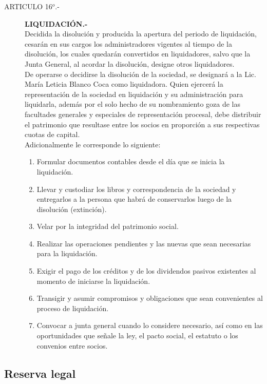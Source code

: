 \documentclass[11pt,letterpaper]{report}
\begin{document}
\begin{description}
\item[ARTICULO 16$^{o}$.-]{\bf LIQUIDACI\'ON.- }\\
Decidida la disoluci\'on y producida la apertura del periodo de liquidaci\'on, cesar\'an en sus cargos los administradores vigentes al tiempo de la disoluci\'on, los cuales quedar\'an convertidos en liquidadores, salvo que la Junta General, al acordar la disoluci\'on, designe otros liquidadores.\\
De operarse o decidirse la disoluci\'on de la sociedad, se designar\'a a la Lic. Mar\'ia Leticia Blanco Coca como liquidadora. Quien ejercer\'a la representaci\'on de la sociedad en liquidaci\'on y su administraci\'on para liquidarla, adem\'as por el solo hecho de su nombramiento goza de las facultades generales y especiales de representaci\'on procesal, debe distribuir el patrimonio que resultase entre los socios en proporci\'on a sus respectivas cuotas de capital.\\
Adicionalmente le corresponde lo siguiente:
\begin{enumerate}
\item Formular documentos contables desde el d\'ia que se inicia la liquidaci\'on.
\item Llevar y custodiar los libros y correspondencia de la sociedad y entregarlos a la persona que habr\'a de conservarlos luego de la disoluci\'on (extinci\'on).
\item Velar por la integridad del patrimonio social.
\item Realizar las operaciones pendientes y las nuevas que sean necesarias para la liquidaci\'on.
\item Exigir el pago de los cr\'editos y de los dividendos pasivos existentes al momento de iniciarse la liquidaci\'on.
\item Transigir y asumir compromisos y obligaciones que sean convenientes al proceso de liquidaci\'on.
\item Convocar a junta general cuando lo considere necesario, as\'i como en las oportunidades que se\~nale la ley, el pacto social, el estatuto o los convenios entre socios.
\end{enumerate}
\end{description}

\subsection{ Reserva legal }
\end{document}
